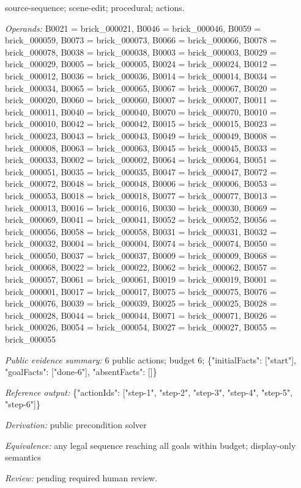 \begin{enumerate}
\par{\small source-sequence; scene-edit; procedural; actions.\par\textit{Operands:} B0021 = brick\_000021, B0046 = brick\_000046, B0059 = brick\_000059, B0073 = brick\_000073, B0066 = brick\_000066, B0078 = brick\_000078, B0038 = brick\_000038, B0003 = brick\_000003, B0029 = brick\_000029, B0005 = brick\_000005, B0024 = brick\_000024, B0012 = brick\_000012, B0036 = brick\_000036, B0014 = brick\_000014, B0034 = brick\_000034, B0065 = brick\_000065, B0067 = brick\_000067, B0020 = brick\_000020, B0060 = brick\_000060, B0007 = brick\_000007, B0011 = brick\_000011, B0040 = brick\_000040, B0070 = brick\_000070, B0010 = brick\_000010, B0042 = brick\_000042, B0015 = brick\_000015, B0023 = brick\_000023, B0043 = brick\_000043, B0049 = brick\_000049, B0008 = brick\_000008, B0063 = brick\_000063, B0045 = brick\_000045, B0033 = brick\_000033, B0002 = brick\_000002, B0064 = brick\_000064, B0051 = brick\_000051, B0035 = brick\_000035, B0047 = brick\_000047, B0072 = brick\_000072, B0048 = brick\_000048, B0006 = brick\_000006, B0053 = brick\_000053, B0018 = brick\_000018, B0077 = brick\_000077, B0013 = brick\_000013, B0016 = brick\_000016, B0030 = brick\_000030, B0069 = brick\_000069, B0041 = brick\_000041, B0052 = brick\_000052, B0056 = brick\_000056, B0058 = brick\_000058, B0031 = brick\_000031, B0032 = brick\_000032, B0004 = brick\_000004, B0074 = brick\_000074, B0050 = brick\_000050, B0037 = brick\_000037, B0009 = brick\_000009, B0068 = brick\_000068, B0022 = brick\_000022, B0062 = brick\_000062, B0057 = brick\_000057, B0061 = brick\_000061, B0019 = brick\_000019, B0001 = brick\_000001, B0017 = brick\_000017, B0075 = brick\_000075, B0076 = brick\_000076, B0039 = brick\_000039, B0025 = brick\_000025, B0028 = brick\_000028, B0044 = brick\_000044, B0071 = brick\_000071, B0026 = brick\_000026, B0054 = brick\_000054, B0027 = brick\_000027, B0055 = brick\_000055\par\textit{Public evidence summary:} 6 public actions; budget 6; \{"initialFacts": ["start"], "goalFacts": ["done-6"], "absentFacts": []\}\par\textit{Reference output:} \{"actionIds": ["step-1", "step-2", "step-3", "step-4", "step-5", "step-6"]\}\par\textit{Derivation:} public precondition solver\par\textit{Equivalence:} any legal sequence reaching all goals within budget; display-only semantics\par\textit{Review:} pending required human review.}

\end{enumerate}
